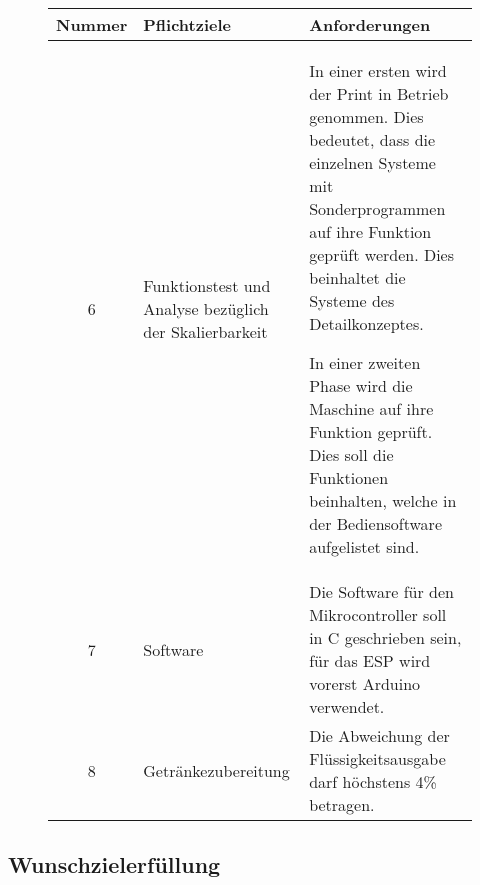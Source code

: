 \begin{figure}[H]
	\begin{flushleft}
	\small
		\begin{tabular}{|p{3cm}|p{3.25cm}|p{9.85cm}|}%
\hline
\multicolumn{1}{|l|}{\textbf{Nummer}} & \textbf{Pflichtziele}  & \textbf{Anforderungen}                                                                                                                                            \\ \hline

\multicolumn{1}{|c|}{\cellcolor{green}6} & \cellcolor{green}Funktionstest und Analyse bezüglich der Skalierbarkeit & \cellcolor{green} In einer ersten wird der Print in Betrieb genommen. Dies bedeutet, dass die einzelnen Systeme mit Sonderprogrammen auf ihre Funktion geprüft werden. Dies beinhaltet die Systeme des Detailkonzeptes.

In einer zweiten Phase wird die Maschine auf ihre Funktion geprüft. Dies soll die Funktionen beinhalten, welche in der Bediensoftware aufgelistet sind. \\ \hline	

\multicolumn{1}{|c|}{\cellcolor{green}7} & \cellcolor{green}Software & \cellcolor{green}Die Software für den Mikrocontroller soll in C geschrieben sein, für das ESP wird vorerst Arduino verwendet. \\ \hline

\multicolumn{1}{|c|}{\cellcolor{green}8} & \cellcolor{green}Getränkezubereitung & \cellcolor{green}Die Abweichung der Flüssigkeitsausgabe darf höchstens 4\% betragen. \\ \hline	
		\end{tabular}
	\end{flushleft}
	\label{table:Pflichtziele2}
	
\end{figure}

\subsection{Wunschzielerfüllung}
\label{subsubsec:Wunschzielerfüllung}

